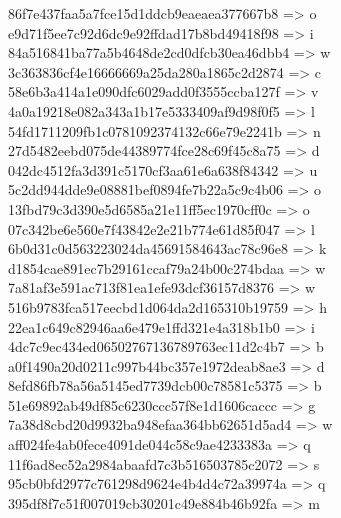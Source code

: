 \begin{beispiel}
\begin{figure}[h] %
86f7e437faa5a7fce15d1ddcb9eaeaea377667b8 => o \\%
e9d71f5ee7c92d6dc9e92ffdad17b8bd49418f98 => i \\%
84a516841ba77a5b4648de2cd0dfcb30ea46dbb4 => w \\%
3c363836cf4e16666669a25da280a1865c2d2874 => c \\%
58e6b3a414a1e090dfc6029add0f3555ccba127f => v \\%
4a0a19218e082a343a1b17e5333409af9d98f0f5 => l \\%
54fd1711209fb1c0781092374132c66e79e2241b => n \\%
27d5482eebd075de44389774fce28c69f45c8a75 => d \\%
042dc4512fa3d391c5170cf3aa61e6a638f84342 => u \\%
5c2dd944dde9e08881bef0894fe7b22a5c9c4b06 => o \\%
13fbd79c3d390e5d6585a21e11ff5ec1970cff0c => o \\%
07c342be6e560e7f43842e2e21b774e61d85f047 => l \\%
6b0d31c0d563223024da45691584643ac78c96e8 => k \\%
d1854cae891ec7b29161ccaf79a24b00c274bdaa => w \\%
7a81af3e591ac713f81ea1efe93dcf36157d8376 => w \\%
516b9783fca517eecbd1d064da2d165310b19759 => h \\%
22ea1c649c82946aa6e479e1ffd321e4a318b1b0 => i \\%
4dc7c9ec434ed06502767136789763ec11d2c4b7 => b \\%
a0f1490a20d0211c997b44bc357e1972deab8ae3 => d \\%
8efd86fb78a56a5145ed7739dcb00c78581c5375 => b \\%
51e69892ab49df85c6230ccc57f8e1d1606caccc => g \\%
7a38d8cbd20d9932ba948efaa364bb62651d5ad4 => w \\%
aff024fe4ab0fece4091de044c58c9ae4233383a => q \\%
11f6ad8ec52a2984abaafd7c3b516503785c2072 => s \\%
95cb0bfd2977c761298d9624e4b4d4c72a39974a => q \\%
395df8f7c51f007019cb30201c49e884b46b92fa => m \\
\begin{center}

\end{center}
\end{figure}
\end{beispiel}
